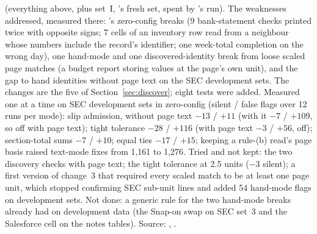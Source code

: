 \textbf{} (everything above, plus set~I, 's fresh set, spent by 's run). The weaknesses addressed, measured there: 's zero-config breaks (9 bank-statement checks printed twice with opposite signs; 7 cells of an inventory row read from a neighbour whose numbers include the record's identifier; one week-total completion on the wrong day), one hand-mode and one discovered-identity break from loose scaled page matches (a budget report storing values at the page's own unit), and the gap to hand identities without page text on the SEC development sets. The changes are the five of Section~\ref{sec:discover}; eight tests were added. Measured one at a time on SEC development sets in zero-config (silent / false flags over 12 runs per mode): slip admission, without page text $-13$ / $+11$ (with it $-7$ / $+109$, so off with page text); tight tolerance $-28$ / $+116$ (with page text $-3$ / $+56$, off); section-total sums $-7$ / $+10$; equal ties $-17$ / $+15$; keeping a rule-(b) read's page basis raised text-mode fixes from 1,161 to 1,276. Tried and not kept: the two discovery checks with page text; the tight tolerance at 2.5 units ($-3$ silent); a first version of change~3 that required every scaled match to be at least one page unit, which stopped confirming SEC sub-unit lines and added 54 hand-mode flags on development sets. Not done: a generic rule for the two hand-mode breaks  already had on development data (the Snap-on swap on SEC set~3 and the Salesforce cell on the notes tables). Source: , .

